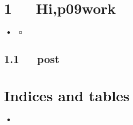 \documentclass[letterpaper,12pt,english]{sphinxmanual}
\begin{document}
\chapter{1   Hi,p09work}
\label{\detokenize{p09work/Hello_uff0cp09work:hi-p09work}}\label{\detokenize{p09work/Hello_uff0cp09work::doc}}
\begin{sphinxShadowBox}
\begin{itemize}
\item {} 
\label{\detokenize{p09work/Hello_uff0cp09work:id2}}{\hyperref[\detokenize{p09work/Hello_uff0cp09work:hi-p09work}]{}}
\begin{itemize}
\item {} 
\label{\detokenize{p09work/Hello_uff0cp09work:id3}}{\hyperref[\detokenize{p09work/Hello_uff0cp09work:post}]{}}

\end{itemize}

\end{itemize}
\end{sphinxShadowBox}


\section{1.1   post}
\label{\detokenize{p09work/Hello_uff0cp09work:post}}

\chapter{Indices and tables}
\label{\detokenize{index:indices-and-tables}}\begin{itemize}
\item {} 

\end{itemize}



\renewcommand{\indexname}{索引}
\printindex
\end{document}
